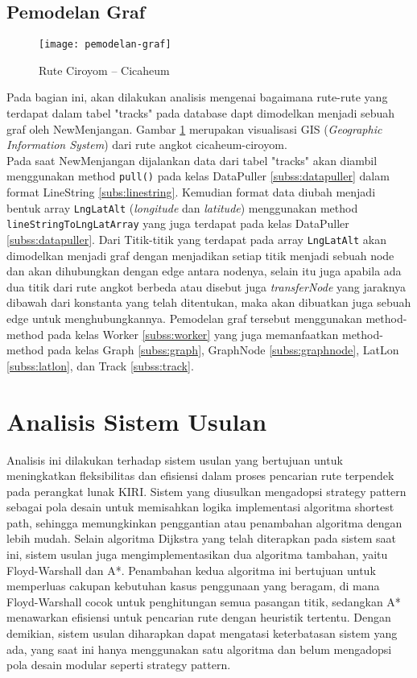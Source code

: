 \subsection{Pemodelan Graf}
\begin{figure}[H] 
    \centering  
    \texttt{[image: pemodelan-graf]}  
    \caption{Rute Ciroyom – Cicaheum}
    \label{fig:pemodelangraf} 
\end{figure}
\noindent
Pada bagian ini, akan dilakukan analisis mengenai bagaimana rute-rute yang terdapat dalam tabel "tracks" pada database dapt dimodelkan menjadi sebuah graf oleh NewMenjangan. Gambar \ref{fig:pemodelangraf} merupakan visualisasi GIS (\textit{Geographic Information System}) dari rute angkot cicaheum-ciroyom.
\\
Pada saat NewMenjangan dijalankan data dari tabel "tracks" akan diambil menggunakan method \texttt{pull()} pada kelas DataPuller \ref{subss:datapuller} dalam format LineString \ref{subs:linestring}. Kemudian format data diubah menjadi bentuk array \texttt{LngLatAlt} (\textit{longitude} dan \textit{latitude}) menggunakan method \texttt{lineStringToLngLatArray} yang juga terdapat pada kelas DataPuller \ref{subss:datapuller}. Dari Titik-titik yang terdapat pada array \texttt{LngLatAlt} akan dimodelkan menjadi graf dengan menjadikan setiap titik menjadi sebuah node dan akan dihubungkan dengan edge antara nodenya, selain itu juga apabila ada dua titik dari rute angkot berbeda atau disebut juga \textit{transferNode} yang jaraknya dibawah dari konstanta yang telah ditentukan, maka akan dibuatkan juga sebuah edge untuk menghubungkannya. Pemodelan graf tersebut menggunakan method-method pada kelas Worker \ref{subss:worker} yang juga memanfaatkan method-method pada kelas Graph \ref{subss:graph}, GraphNode \ref{subss:graphnode}, LatLon \ref{subss:latlon}, dan Track \ref{subss:track}.

\section{Analisis Sistem Usulan}
Analisis ini dilakukan terhadap sistem usulan yang bertujuan untuk meningkatkan fleksibilitas dan efisiensi dalam proses pencarian rute terpendek pada perangkat lunak KIRI. Sistem yang diusulkan mengadopsi strategy pattern sebagai pola desain untuk memisahkan logika implementasi algoritma shortest path, sehingga memungkinkan penggantian atau penambahan algoritma dengan lebih mudah. Selain algoritma Dijkstra yang telah diterapkan pada sistem saat ini, sistem usulan juga mengimplementasikan dua algoritma tambahan, yaitu Floyd-Warshall dan A*. Penambahan kedua algoritma ini bertujuan untuk memperluas cakupan kebutuhan kasus penggunaan yang beragam, di mana Floyd-Warshall cocok untuk penghitungan semua pasangan titik, sedangkan A* menawarkan efisiensi untuk pencarian rute dengan heuristik tertentu. Dengan demikian, sistem usulan diharapkan dapat mengatasi keterbatasan sistem yang ada, yang saat ini hanya menggunakan satu algoritma dan belum mengadopsi pola desain modular seperti strategy pattern.

